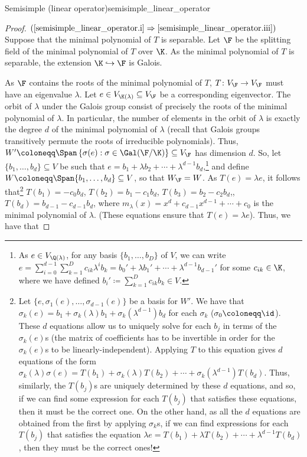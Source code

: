 \begin{thm}{Semisimple (linear operator)}{semisimple_linear_operator}
\begin{proof}
		\blankline
		\noindent
		$(\cref{semisimple_linear_operator.i}\Rightarrow \cref{semisimple_linear_operator.iii})$ Suppose that the minimal polynomial of $T$ is separable.  Let $\F$ be the splitting field of the minimal polynomial of $T$ over $\K$.  As the minimal polynomial of $T$ is separable, the extension $\K \hookrightarrow \F$ is Galois.  
		
		As $\F$ contains the roots of the minimal polynomial of $T$, $T\colon V_{\F}\rightarrow V_{\F}$ must have an eigenvalue $\lambda$.  Let $e\in V_{\K (\lambda )}\subseteq V_{\F}$ be a corresponding eigenvector.  The orbit of $\lambda$ under the Galois group consist of precisely the roots of the minimal polynomial of $\lambda$.  In particular, the number of elements in the orbit of $\lambda$ is exactly the degree $d$ of the minimal polynomial of $\lambda$ (recall that Galois groups transitively permute the roots of irreducible polynomials).  Thus, $W'\coloneqq \Span \left\{ \sigma (e):\sigma \in \Gal (\F /\K )\right\} \subseteq V_{\F}$ has dimension $d$.  So, let $\{ b_1,\ldots ,b_d\} \subseteq V$ be such that $e=b_1+\lambda b_2+\cdots +\lambda ^{d-1}b_d$,\footnote{As $e\in V_{\Q (\lambda )}$, for any basis $\{ b_1,\ldots ,b_D\}$ of $V$, we can write $e=\sum _{i=0}^{d-1}\sum _{k=1}^Dc_{ik}\lambda ^ib_k=b_0'+\lambda b_1'+\cdots +\lambda ^{d-1}b_{d-1}'$ for some $c_{ik}\in \K$, where we have defined $b_i'\coloneqq \sum _{k=1}^Dc_{ik}b_k\in V$.} and define $W\coloneqq \Span \{ b_1,\ldots ,b_d\} \subseteq V$, so that $W_{\F}=W$.  As $T(e)=\lambda e$, it follows that\footnote{Let $\{ e,\sigma _1(e),\ldots ,\sigma _{d-1}(e)\}$ be a basis for $W'$.  We have that $\sigma _k(e)=b_1+\sigma _k(\lambda )b_1+\sigma _k(\lambda ^{d-1})b_d$ for each $\sigma _k$ ($\sigma _0\coloneqq \id$).  These $d$ equations allow us to uniquely solve for each $b_j$ in terms of the $\sigma _k(e)$s (the matrix of coefficients has to be invertible in order for the $\sigma _k(e)$s to be linearly-independent).  Applying $T$ to this equation gives $d$ equations of the form $\sigma _k(\lambda )\sigma (e)=T(b_1)+\sigma _k(\lambda )T(b_2)+\cdots +\sigma _k(\lambda ^{d-1})T(b_d)$.  Thus, similarly, the $T(b_j)$s are uniquely determined by these $d$ equations, and so, if we can find some expression for each $T(b_j)$ that satisfies these equations, then it must be the correct one.  On the other hand, as all the $d$ equations are obtained from the first by applying $\sigma _k$s, if we can find expressions for each $T(b_j)$ that satisfies the equation $\lambda e=T(b_1)+\lambda T(b_2)+\cdots +\lambda ^{d-1}T(b_d)$, then they must be the correct ones!} $T(b_1)=-c_0b_d$, $T(b_2)=b_1-c_1b_d$, $T(b_3)=b_2-c_2b_d$,\textellipsis, $T(b_d)=b_{d-1}-c_{d-1}b_d$, where $m_{\lambda}(x)=x^d+c_{d-1}x^{d-1}+\cdots +c_0$ is the minimal polynomial of $\lambda$.  (These equations ensure that $T(e)=\lambda e$).  Thus, we have that

\end{proof}
\end{thm}
